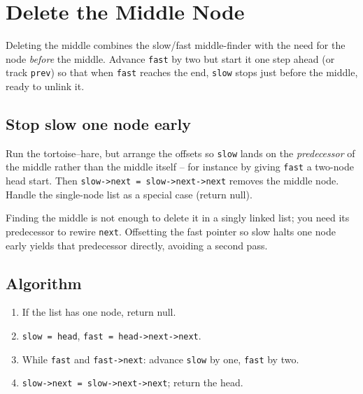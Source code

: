 \section{Delete the Middle Node}
\label{sec:ll-delete-middle}


\begin{patternbox}
Deleting the middle combines the slow/fast middle-finder with the need for
the node \emph{before} the middle. Advance \texttt{fast} by two but start it
one step ahead (or track \texttt{prev}) so that when \texttt{fast} reaches
the end, \texttt{slow} stops just before the middle, ready to unlink it.
\end{patternbox}

\subsection*{Stop slow one node early}

Run the tortoise--hare, but arrange the offsets so \texttt{slow} lands on the
\emph{predecessor} of the middle rather than the middle itself -- for
instance by giving \texttt{fast} a two-node head start. Then
\texttt{slow->next = slow->next->next} removes the middle node. Handle the
single-node list as a special case (return null).

\begin{ideabox}
Finding the middle is not enough to delete it in a singly linked list; you
need its predecessor to rewire \texttt{next}. Offsetting the fast pointer so
slow halts one node early yields that predecessor directly, avoiding a
second pass.
\end{ideabox}

\subsection*{Algorithm}

\begin{enumerate}
  \item If the list has one node, return null.
  \item \texttt{slow = head}, \texttt{fast = head->next->next}.
  \item While \texttt{fast} and \texttt{fast->next}: advance \texttt{slow}
        by one, \texttt{fast} by two.
  \item \texttt{slow->next = slow->next->next}; return the head.
\end{enumerate}


